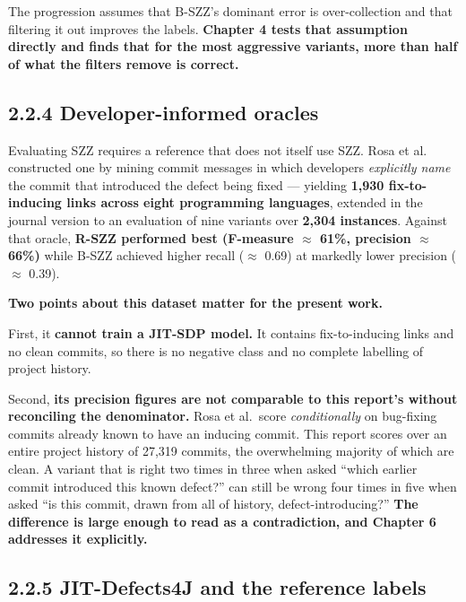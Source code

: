 The progression assumes that B-SZZ's dominant error is over-collection
and that filtering it out improves the labels. \textbf{Chapter 4 tests
that assumption directly and finds that for the most aggressive
variants, more than half of what the filters remove is correct.}

\subsection{2.2.4 Developer-informed
oracles}\label{developer-informed-oracles}

Evaluating SZZ requires a reference that does not itself use SZZ. Rosa
et al. \citep{rosa2021oracle, rosa2023szzvariants} constructed one by
mining commit messages in which developers \emph{explicitly name} the
commit that introduced the defect being fixed --- yielding \textbf{1,930
fix-to-inducing links across eight programming languages}, extended in
the journal version to an evaluation of nine variants over \textbf{2,304
instances}. Against that oracle, \textbf{R-SZZ performed best (F-measure
\ensuremath{\approx} 61\%, precision \ensuremath{\approx} 66\%)} while B-SZZ achieved higher recall (\ensuremath{\approx} 0.69)
at markedly lower precision (\ensuremath{\approx} 0.39).

\textbf{Two points about this dataset matter for the present work.}

First, it \textbf{cannot train a JIT-SDP model.} It contains
fix-to-inducing links and no clean commits, so there is no negative
class and no complete labelling of project history.

Second, \textbf{its precision figures are not comparable to this
report's without reconciling the denominator.} Rosa et al.~score
\emph{conditionally} on bug-fixing commits already known to have an
inducing commit. This report scores over an entire project history of
27,319 commits, the overwhelming majority of which are clean. A variant
that is right two times in three when asked ``which earlier commit
introduced this known defect?'' can still be wrong four times in five
when asked ``is this commit, drawn from all of history,
defect-introducing?'' \textbf{The difference is large enough to read as
a contradiction, and Chapter 6 addresses it explicitly.}

\subsection{2.2.5 JIT-Defects4J and the reference
labels}\label{jit-defects4j-and-the-reference-labels}

